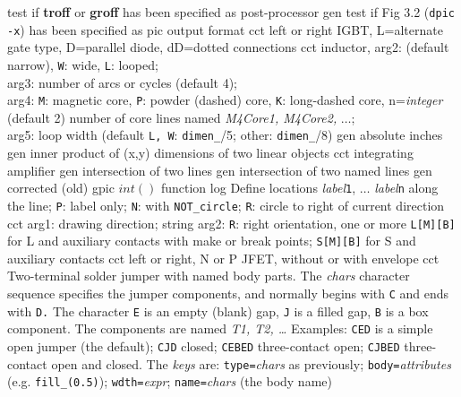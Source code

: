   {test if {\bf troff} or {\bf groff} has been specified as post-processor}%
%
  {gen}%
  {test if Fig 3.2 ({\tt dpic -x}) has been specified as pic output format}%
%
  {cct}%
  {left or right IGBT, L=alternate gate type, D=parallel diode,
   dD=dotted connections }%
%
  {cct}%
  {inductor, arg2: (default narrow), {\tt W}: wide, {\tt L}: looped;\\
   arg3: number of arcs or cycles (default 4);\\
   arg4:
   {\tt M}: magnetic core,
   {\tt P}: powder (dashed) core,
   {\tt K}: long-dashed core,
     n={\sl integer} (default 2) number of core lines named
     {\sl M4Core1, M4Core2,} $\ldots$;\\
   arg5: loop width (default {\tt L, W}: {\tt dimen\_}/5;
     other: {\tt dimen\_}/8)
   }%
%
  {gen}%
  {absolute inches}%
%
  {gen}%
  {inner product of (x,y) dimensions of two linear objects}%
%
  {cct}%
  {integrating amplifier}%
%
  {gen}%
  {intersection of two lines}%
%
  {gen}%
  {intersection of two named lines}%
%
  {gen}%
  {corrected (old) gpic $int()$ function}%
%
  {log}%
  {Define locations {\sl label}{\tt 1}, $\ldots$ {\sl label}{\tt n}%
    along the line; {\tt P}: label only;
    {\tt N}: with {\tt NOT\_circle};
    {\tt R}: circle to right of current direction }%
%
%
%
  {cct}%
  {arg1: drawing direction; string arg2: {\tt R}: right orientation,
   one or more {\tt L[M][B]} for L and auxiliary contacts with make or break
   points; {\tt S[M][B]} for S and auxiliary contacts
   }%
%
  {cct}%
  {left or right, N or P JFET, without or with envelope
    }%
%
  {cct}%
  { Two-terminal solder jumper with named body parts.
    The {\sl chars} character sequence specifies the jumper components,
    and normally begins with {\tt C} and ends with {\tt D.} The character
    {\tt E} is an empty (blank) gap, {\tt J} is a filled gap, {\tt B}%
    is a box component.  The components are named {\sl T1, T2, \ldots}%
    Examples: {\tt CED} is a simple open jumper (the default); {\tt CJD}%
    closed; {\tt CEBED} three-contact open; {\tt CJBED} three-contact
    open and closed.
    The {\sl keys} are: {\tt type=}{\sl chars} as previously;
                        {\tt body=}{\sl attributes} (e.g. {\tt fill\_(0.5)});
                        {\tt wdth=}{\sl expr};
                        {\tt name=}{\sl chars} (the body name)%
}%
